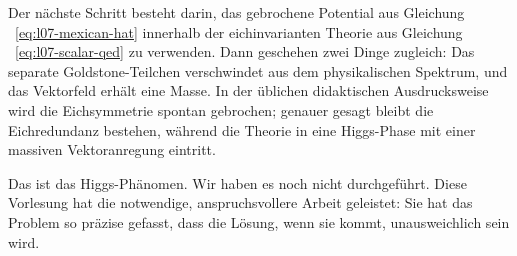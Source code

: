 Der nächste Schritt besteht darin, das gebrochene Potential aus Gleichung ~\eqref{eq:l07-mexican-hat} innerhalb der eichinvarianten Theorie aus Gleichung ~\eqref{eq:l07-scalar-qed} zu verwenden. Dann geschehen zwei Dinge zugleich: Das separate Goldstone-Teilchen verschwindet aus dem physikalischen Spektrum, und das Vektorfeld erhält eine Masse. In der üblichen didaktischen Ausdrucksweise wird die Eichsymmetrie spontan gebrochen; genauer gesagt bleibt die Eichredundanz bestehen, während die Theorie in eine Higgs-Phase mit einer massiven Vektoranregung eintritt.

Das ist das Higgs-Phänomen. Wir haben es noch nicht durchgeführt. Diese Vorlesung hat die notwendige, anspruchsvollere Arbeit geleistet: Sie hat das Problem so präzise gefasst, dass die Lösung, wenn sie kommt, unausweichlich sein wird.